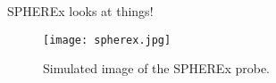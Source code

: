 SPHEREx looks at things!

\begin{figure}[th]
	\centering
	\texttt{[image: spherex.jpg]}
	\caption[SPHEREx]{Simulated image of the SPHEREx probe.}
	\label{fig:spherex}
\end{figure}
